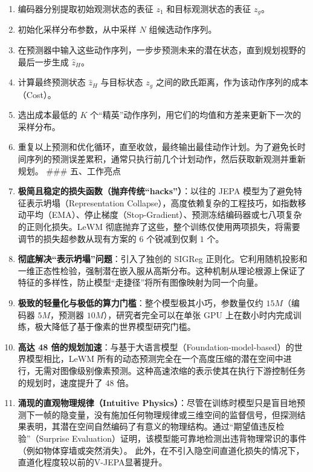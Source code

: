 \begin{enumerate}
\def\labelenumi{\arabic{enumi}.}
\item
  编码器分别提取初始观测状态的表征 \(z_1\) 和目标观测状态的表征 \(z_g\)。
\item
  初始化采样分布参数，从中采样 \(N\) 组候选动作序列。
\item
  在预测器中输入这些动作序列，一步步预测未来的潜在状态，直到规划视野的最后一步生成 \(\hat{z}_H\)。
\item
  计算最终预测状态 \(\hat{z}_H\) 与目标状态 \(z_g\) 之间的欧氏距离，作为该动作序列的成本（Cost）。
\item
  选出成本最低的 \(K\) 个``精英''动作序列，用它们的均值和方差来更新下一次的采样分布。
\item
  重复以上预测和优化循环，直至收敛，最终输出最佳动作计划。为了避免长时间序列的预测误差累积，通常只执行前几个计划动作，然后获取新观测并重新规划。
  \#\#\# 五、工作亮点
\item
  \textbf{极简且稳定的损失函数（抛弃传统``hacks''）}：以往的 JEPA 模型为了避免特征表示坍塌（Representation Collapse），高度依赖复杂的工程技巧，如指数移动平均（EMA）、停止梯度（Stop-Gradient）、预测冻结编码器或七八项复杂的正则化损失。LeWM 彻底抛弃了这些，整个训练仅使用两项损失，将需要调节的损失超参数从现有方案的 \(6\) 个锐减到仅剩 \(1\) 个。
\item
  \textbf{彻底解决``表示坍塌''问题}：引入了独创的 SIGReg 正则化。它利用随机投影和一维正态性检验，强制潜在嵌入服从高斯分布。这种机制从理论根源上保证了特征的多样性，防止模型``走捷径''将所有图像映射为同一个向量。
\item
  \textbf{极致的轻量化与极低的算力门槛}：整个模型极其小巧，参数量仅约 \(15M\)（编码器 \(5M\)，预测器 \(10M\)），研究者完全可以在单张 GPU 上在数小时内完成训练，极大降低了基于像素的世界模型研究门槛。
\item
  \textbf{高达 48 倍的规划加速}：与基于大语言模型（Foundation-model-based）的世界模型相比，LeWM 所有的动态预测完全在一个高度压缩的潜在空间中进行，无需对图像级别像素预测。这种高速浓缩的表示使其在执行下游控制任务的规划时，速度提升了 \(48\) 倍。
\item
  \textbf{涌现的直观物理规律（Intuitive Physics）}：尽管在训练时模型只是盲目地预测下一帧的隐变量，没有施加任何物理规律或三维空间的监督信号，但探测结果表明，其潜在空间自然编码了有意义的物理结构。通过``期望值违反检验''（Surprise Evaluation）证明，该模型能可靠地检测出违背物理常识的事件（例如物体穿墙或突然消失）。
  此外，在不引入隐空间直道化损失的情况下，直道化程度较以前的V-JEPA显著提升。
\end{enumerate}

